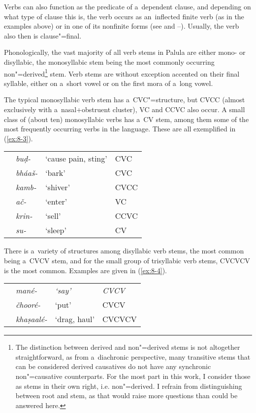 Verbs can also function as the predicate of a~dependent clause, and depending on what type of clause this is, the verb occurs as an~inflected finite verb (as in the examples above) or in one of its nonfinite forms (see  and --). Usually, the verb also then is clause"=final.


Phonologically, the vast majority of all verb stems in Palula are either mono- or disyllabic, the monosyllabic stem being the most commonly occurring non"=derived\footnote{The distinction between derived and non"=derived stems is not altogether straightforward, as from a~diachronic perspective, many transitive stems that can be considered derived causatives do not have any synchronic non"=causative counterparts. For the most part in this work, I consider those as stems in their own right, i.e. non"=derived. I refrain from distinguishing between root and stem, as that would raise more questions than could be answered here.} stem. Verb stems are without exception accented on their final syllable, either on a~short vowel or on the first mora of a~long vowel. 


The typical monosyllabic verb stem has a~CVC"=structure, but CVCC (almost exclusively with a~nasal+obstruent cluster), VC and CCVC also occur. A small class of (about ten) monosyllabic verbs has a~CV stem, among them some of the most frequently occurring verbs in the language. These are all exemplified in (\ref{ex:8-3}).


\begin{exe}
\extab
\label{ex:8-3}
\begin{tabularx}{\textwidth}{ l l l l }
&
\textit{buḍ-} &
`cause pain, sting' &
CVC\\
&
\textit{bháaš-} &
`bark' &
CVC\\
&
\textit{kamb-} &
`shiver' &
CVCC\\
&
\textit{ač-} &
`enter' &
VC\\
&
\textit{krin-} &
`sell' &
CCVC\\
&
\textit{su-} &
`sleep' &
CV\\
\end{tabularx}
\end{exe}


There is a~variety of structures among disyllabic verb stems, the most common being a~CVCV stem, and for the small group of trisyllabic verb stems, CVCVCV is the most common. Examples are given in (\ref{ex:8-4}).


\begin{exe}
\extab
\label{ex:8-4}
\begin{tabularx}{\textwidth}{ l l l l }

&
\textit{mané-} &
\textit{\textup{`say'}} &
\textit{\textup{CVCV}} \\
&
\textit{čhooré-} &
`put' &
CVCV\\
&
\textit{khaṣaalé-} &
`drag, haul' &
CVCVCV\\
\end{tabularx}
\end{exe}


